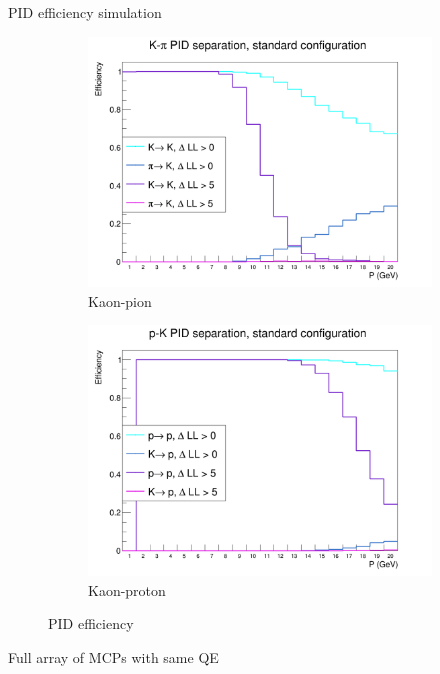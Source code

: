 \documentclass{beamer}
\begin{document}
\begin{frame}{PID efficiency simulation}
  \begin{figure}
    \centering
    \vspace{-0.2cm}
    \begin{subfigure}{0.5\textwidth}
      \includegraphics[width = 1.0\textwidth]{Plots/KaonPionPIDEfficiencyStandard.png}
      \caption{Kaon-pion}
    \end{subfigure}%
    \begin{subfigure}{0.5\textwidth}
      \includegraphics[width = 1.0\textwidth]{Plots/PionProtonPIDEfficiencyStandard.png}
      \caption{Kaon-proton}
    \end{subfigure}
    \caption{PID efficiency}
  \end{figure}
  \begin{center}
    Full array of MCPs with same QE
  \end{center}
\end{frame}
\end{document}
